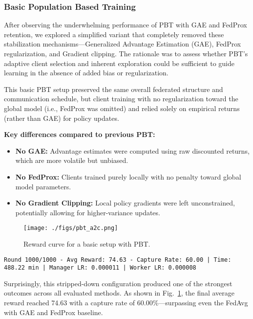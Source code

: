 \documentclass[12pt,a4paper,twoside,openany]{book}
\begin{document}
\subsubsection{Basic Population Based Training}

After observing the underwhelming performance of PBT with GAE and FedProx retention, we explored a simplified variant that completely removed these stabilization mechanisms—Generalized Advantage Estimation (GAE), FedProx regularization, and Gradient clipping. The rationale was to assess whether PBT’s adaptive client selection and inherent exploration could be sufficient to guide learning in the absence of added bias or regularization.

This basic PBT setup preserved the same overall federated structure and communication schedule, but client training with no regularization toward the global model (i.e., FedProx was omitted) and relied solely on empirical returns (rather than GAE) for policy updates.

\textbf{Key differences compared to previous PBT:}
\begin{itemize}
  \item \textbf{No GAE:} Advantage estimates were computed using raw discounted returns, which are more volatile but unbiased.
  \item \textbf{No FedProx:} Clients trained purely locally with no penalty toward global model parameters.
  \item \textbf{No Gradient Clipping:} Local policy gradients were left unconstrained, potentially allowing for higher-variance updates.
\end{itemize}

\begin{figure}[H]
\centering
\texttt{[image: ./figs/pbt\_a2c.png]}
\captionsetup{font=small}
\caption{Reward curve for a basic setup with PBT.}
\label{fig:pbt_a2c_light}
\end{figure}

\begin{lstlisting}
Round 1000/1000 - Avg Reward: 74.63 - Capture Rate: 60.00 | Time: 488.22 min | Manager LR: 0.000011 | Worker LR: 0.000008
\end{lstlisting}

Surprisingly, this stripped-down configuration produced one of the strongest outcomes across all evaluated methods. As shown in Fig.~\ref{fig:pbt_a2c_light}, the final average reward reached 74.63 with a capture rate of 60.00\%—surpassing even the FedAvg with GAE and FedProx baseline.
\end{document}
